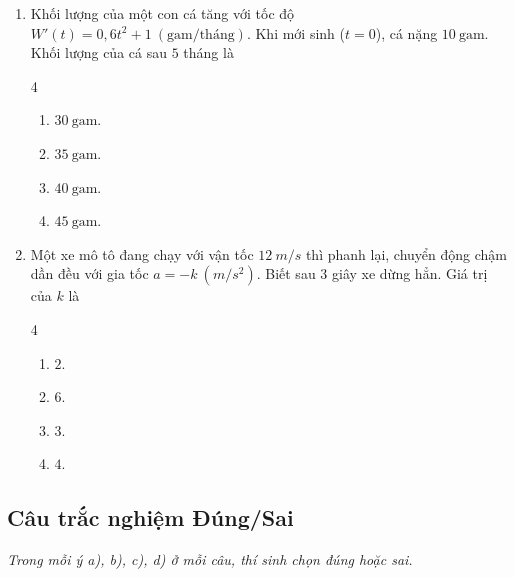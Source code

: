\documentclass[12pt]{article}
\begin{document}
\begin{enumerate}[label=\textbf{Câu \arabic*.}]
		\item Khối lượng của một con cá tăng với tốc độ $W'(t) = 0,6t^2 + 1 \ (\text{gam/tháng})$. Khi mới sinh ($t = 0$), cá nặng $10 \ \text{gam}$. Khối lượng của cá sau $5$ tháng là
		\begin{multicols}{4}
			\begin{enumerate}[label=\textbf{\Alph*.}]
				\item $30 \ \text{gam}$.
				\item $35 \ \text{gam}$.
				\item $40 \ \text{gam}$.
				\item $45 \ \text{gam}$.
			\end{enumerate}
		\end{multicols}
		
		\item Một xe mô tô đang chạy với vận tốc $12 \ m/s$ thì phanh lại, chuyển động chậm dần đều với gia tốc $a = -k \ (m/s^2)$. Biết sau $3$ giây xe dừng hẳn. Giá trị của $k$ là
		\begin{multicols}{4}
			\begin{enumerate}[label=\textbf{\Alph*.}]
				\item $2$.
				\item $6$.
				\item $3$.
				\item $4$.
			\end{enumerate}
		\end{multicols}
		
	\end{enumerate}
	
	\subsection{Câu trắc nghiệm Đúng/Sai}
	\textit{Trong mỗi ý a), b), c), d) ở mỗi câu, thí sinh chọn đúng hoặc sai.}
	
\end{document}

